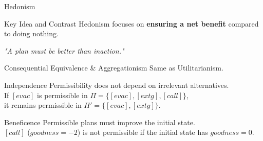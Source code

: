 \documentclass[compress,xcolor=table]{beamer}
\begin{document}
\begin{frame}{Hedonism}
    \begin{block}{Key Idea and Contrast}
        Hedonism focuses on \textbf{ensuring a net benefit} compared to doing nothing. \\
        \begin{center}
            \textit{"A plan must be better than inaction."}
        \end{center}
    \end{block}
    \tiny
    \begin{block}{Consequential Equivalence \& Aggregationism}
        Same as Utilitarianism.
    \end{block}

    \begin{block}{Independence}
        Permissibility does not depend on irrelevant alternatives.\\
        If $[evac]$ is permissible in $\Pi = \{[evac], [extg], [call]\}$, \\
        it remains permissible in $\Pi' = \{[evac], [extg]\}$.
    \end{block}

    \begin{block}{Beneficence}
        Permissible plans must improve the initial state.\\
        $[call]$ ($goodness = -2$) is not permissible if the initial state has $goodness = 0$.
    \end{block}

\end{frame}
\end{document}
